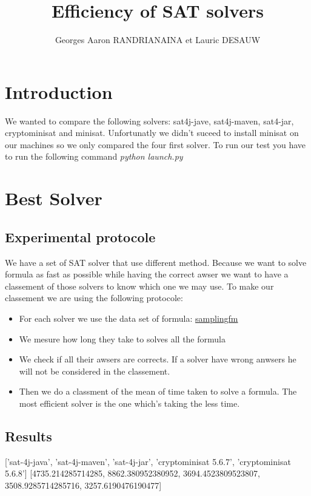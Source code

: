 \documentclass{article}
\title{Efficiency of SAT solvers}
\author{Georges Aaron RANDRIANAINA et Lauric DESAUW}
\begin{document}
\maketitle

\section{Introduction}
We wanted to compare the following solvers: sat4j-jave, sat4j-maven, sat4-jar, cryptominisat and minisat. Unfortunatly we didn't suceed to install minisat on our machines so we only compared the four first solver.
To run our test you have to run the following command \emph{python launch.py}

\section{Best Solver}
\subsection{Experimental protocole}
We have a set of SAT solver that use different method. Because we want to solve formula as fast as possible while having the correct awser we want to have a classement of those solvers to know which one we may use. To make our classement we are using the following protocole:

\begin{itemize}
\item For each solver we use the data set of formula: \href{https://github.com/diverse-project/samplingfm/tree/master/Benchmarks}{samplingfm}
\item We mesure how long they take to solves all the formula
\item We check if all their awsers are corrects. If a solver have wrong anwsers he will not be considered in the classement. 
\item  Then we do a classment of the mean of time taken to solve a formula. The most efficient solver is the one which's taking the less time. 
\end{itemize}
\subsection{Results}

['sat-4j-java', 'sat-4j-maven', 'sat-4j-jar', 'cryptominisat 5.6.7', 'cryptominisat 5.6.8']
[4735.214285714285, 8862.380952380952, 3694.4523809523807, 3508.9285714285716, 3257.6190476190477]
\end{document}
